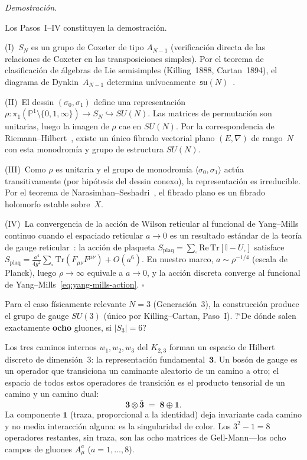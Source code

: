 \documentclass[11pt, a4paper, openany]{book}
\renewenvironment{proof}[1][Demostraci\'on]{%
  \par\noindent\textit{#1.}\quad
}{\hfill$\square$\par\medskip}
\begin{document}
\begin{proof}
Los Pasos~I--IV constituyen la demostraci\'on.

(I)~$S_N$ es un grupo de Coxeter de tipo $A_{N-1}$ (verificaci\'on
directa de las relaciones de Coxeter en las transposiciones simples).
Por el teorema de clasificaci\'on de \'algebras de Lie semisimples
(Killing~1888, Cartan~1894), el diagrama de Dynkin~$A_{N-1}$
determina un\'ivocamente~$\mathfrak{su}(N)$~\cite{humphreys1972}.

(II)~El dessin $(\sigma_0, \sigma_1)$ define una representaci\'on
$\rho \colon \pi_1(\mathbb{P}^1 \setminus \{0,1,\infty\}) \to
S_N \hookrightarrow SU(N)$. Las matrices de permutaci\'on son
unitarias, luego la imagen de $\rho$ cae en $SU(N)$. Por la
correspondencia de Riemann--Hilbert~\cite{deligne1970}, existe un
\'unico fibrado vectorial plano $(E, \nabla)$ de rango~$N$ con esta
monodrom\'ia y grupo de estructura $SU(N)$.

(III)~Como $\rho$ es unitaria y el grupo de monodrom\'ia
$\langle \sigma_0, \sigma_1 \rangle$ act\'ua transitivamente (por
hip\'otesis del dessin conexo), la representaci\'on es irreducible.
Por el teorema de Narasimhan--Seshadri~\cite{narasimhan1965}, el
fibrado plano es un fibrado holomorfo estable sobre~$X$.

(IV)~La convergencia de la acci\'on de Wilson reticular al funcional
de Yang--Mills continuo cuando el espaciado reticular $a \to 0$ es un
resultado est\'andar de la teor\'ia de gauge
reticular~\cite{wilson1974}: la acci\'on de plaqueta
$S_{\mathrm{plaq}} = \sum_{\square} \mathrm{Re}\,\mathrm{Tr}
[\mathbb{I} - U_\square]$ satisface
$S_{\mathrm{plaq}} = \frac{a^4}{4g^2}\sum_\square
\mathrm{Tr}(F_{\mu\nu}F^{\mu\nu}) + O(a^6)$. En nuestro marco,
$a \sim \rho^{-1/4}$ (escala de Planck), luego $\rho \to \infty$
equivale a $a \to 0$, y la acci\'on discreta converge al funcional
de Yang--Mills~\eqref{eq:yang-mills-action}.
\end{proof}

\medskip\noindent
Para el caso f\'isicamente relevante $N = 3$ (Generaci\'on~3), la
construcci\'on produce el grupo de gauge $SU(3)$ (\'unico por
Killing--Cartan, Paso~I). ?`De d\'onde salen exactamente \textbf{ocho}
gluones, si $|S_3| = 6$?

Los tres caminos internos $w_1, w_2, w_3$ del $K_{2,3}$ forman un
espacio de Hilbert discreto de dimensi\'on~3: la representaci\'on
fundamental~$\mathbf{3}$. Un bos\'on de gauge es un operador que
transiciona un caminante aleatorio de un camino a otro; el espacio de
todos estos operadores de transici\'on es el producto tensorial de un
camino y un camino dual:
\[
  \mathbf{3} \otimes \bar{\mathbf{3}}
  \;=\; \mathbf{8} \oplus \mathbf{1}.
\]
La componente $\mathbf{1}$ (traza, proporcional a la identidad) deja
invariante cada camino y no media interacci\'on alguna: es la
singularidad de color. Los $3^2 - 1 = 8$ operadores restantes, sin
traza, son las ocho matrices de Gell-Mann---los ocho campos de gluones
$A_\mu^a$ ($a = 1, \ldots, 8$).
\end{document}
